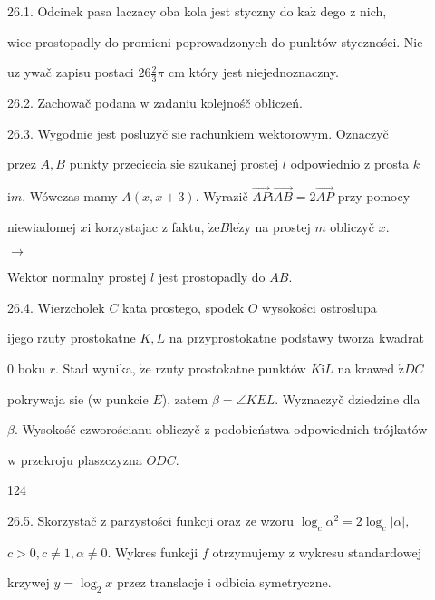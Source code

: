 \documentclass[a4paper,12pt]{article}
\begin{document}
26.1. Odcinek pasa laczacy oba kola jest styczny do $\mathrm{k}\mathrm{a}\dot{\mathrm{z}}$ dego $\mathrm{z}$ nich,

wiec prostopadly do promieni poprowadzonych do punktów styczności. Nie

$\mathrm{u}\dot{\mathrm{z}}$ ywač zapisu postaci $ 26\displaystyle \frac{2}{3}\pi$ cm który jest niejednoznaczny.

26.2. Zachowač podana $\mathrm{w}$ zadaniu kolejnośč obliczeń.

26.3. Wygodnie jest posluzyč $\mathrm{s}\mathrm{i}\mathrm{e}$ rachunkiem wektorowym. Oznaczyč

przez $A, B$ punkty przeciecia $\mathrm{s}\mathrm{i}\mathrm{e}$ szukanej prostej $l$ odpowiednio $\mathrm{z}$ prosta $k$

$\mathrm{i}m$. Wówczas mamy $A(x,x+3)$. Wyrazič $\vec{AP}\mathrm{i}\vec{AB}=2\vec{AP}$ przy pomocy

niewiadomej $x \mathrm{i}$ korzystajac $\mathrm{z}$ faktu, $\dot{\mathrm{z}}\mathrm{e} B \mathrm{l}\mathrm{e}\dot{\mathrm{z}}\mathrm{y}$ na prostej $m$ obliczyč $x.$

$\rightarrow$

Wektor normalny prostej $l$ jest prostopadly do $AB.$

26.4. Wierzcholek $C$ kata prostego, spodek $O$ wysokości ostroslupa

ijego rzuty prostokatne $K, L$ na przyprostokatne podstawy tworza kwadrat

$0$ boku $r$. Stad wynika, $\dot{\mathrm{z}}\mathrm{e}$ rzuty prostokatne punktów $K\mathrm{i}L$ na krawed $\acute{\mathrm{z}}DC$

pokrywaja $\mathrm{s}\mathrm{i}\mathrm{e}$ ($\mathrm{w}$ punkcie $E$), zatem $\beta=\angle KEL$. Wyznaczyč dziedzine dla

$\beta$. Wysokośč czworościanu obliczyč $\mathrm{z}$ podobieństwa odpowiednich trójkatów

$\mathrm{w}$ przekroju plaszczyzna $ODC.$





124

26.5. Skorzystač $\mathrm{z}$ parzystości funkcji oraz ze wzoru $\log_{c}\alpha^{2}=2\log_{c}|\alpha|,$

$c>0, c\neq 1, \alpha\neq 0$. Wykres funkcji $f$ otrzymujemy $\mathrm{z}$ wykresu standardowej

krzywej $y=\log_{2}x$ przez translacje $\mathrm{i}$ odbicia symetryczne.
\end{document}
